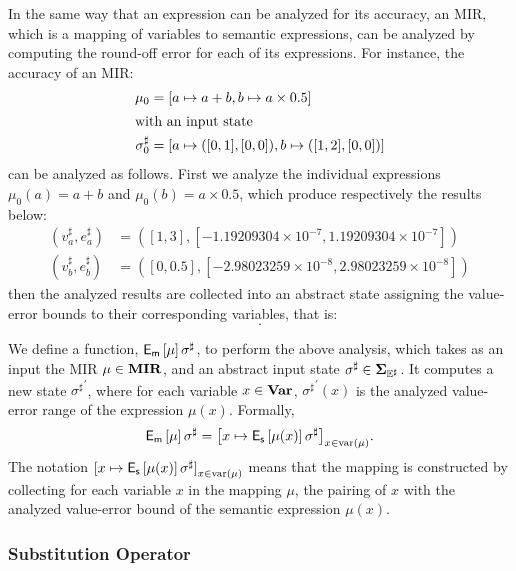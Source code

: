 In the same way that an expression can be analyzed for its accuracy, an MIR,
which is a mapping of variables to semantic expressions, can be analyzed by
computing the round-off error for each of its expressions.  For instance, the
accuracy of an MIR\@:
\begin{align}
    \mu_0 &= [a \mapsto a + b, b \mapsto a \times 0.5] \\
    \intertext{with an input state}
    \sigma^\sharp_0 &= [a \mapsto ([0, 1], [0, 0]), b \mapsto ([1, 2], [0, 0])]
\end{align}
can be analyzed as follows.  First we analyze the individual expressions
$\mu_0(a) = a + b$ and $\mu_0(b) = a \times 0.5$, which produce respectively
the results below:
\begin{align}
    (v^\sharp_a, e^\sharp_a) &= (
        [1, 3], [-1.19209304 \times 10^{-7}, 1.19209304 \times 10^{-7}]) \\
    (v^\sharp_b, e^\sharp_b) &= (
        [0, 0.5], [-2.98023259 \times 10^{-8}, 2.98023259 \times 10^{-8}])
\end{align}
then the analyzed results are collected into an abstract state assigning the
value-error bounds to their corresponding variables, that is:
\begin{equation}
    [a \mapsto (v^\sharp_a, e^\sharp_a), b \mapsto (v^\sharp_b, e^\sharp_b)].
\end{equation}

We define a function, $\operatorname{\mathsf{E}_\mathsf{m}}\left[{\mu}\right]{\sigma^\sharp}$, to perform the
above analysis, which takes as an input the MIR $\mu \in \mathbf{MIR}$, and an
abstract input state $\sigma^\sharp \in \mathbf{\Sigma}_{\mathbb{E}^\sharp}$.  It computes a new
state ${\sigma^\sharp}^\prime$, where for each variable $x \in \mathbf{Var}$,
${\sigma^\sharp}^\prime(x)$ is the analyzed value-error range of the expression
$\mu(x)$.  Formally,
\begin{equation}
    \operatorname{\mathsf{E}_\mathsf{m}}\left[{\mu}\right]{\sigma^\sharp} = {\left[
        x \mapsto \operatorname{\mathsf{E}_\mathsf{s}}\left[{\mu(x)}\right]{\sigma^\sharp}
    \right]}_{x \in \mathrm{var}\left(\mu\right)}.
    \label{eq:mir_accuracy}
\end{equation}
The notation ${[x \mapsto \operatorname{\mathsf{E}_\mathsf{s}}\left[{\mu(x)}\right]{\sigma^\sharp}]}_{x \in
\mathrm{var}\left(\mu\right)}$ means that the mapping is constructed by collecting for
each variable $x$ in the mapping $\mu$, the pairing of $x$ with the analyzed
value-error bound of the semantic expression $\mu(x)$.

\subsubsection{Substitution Operator}


